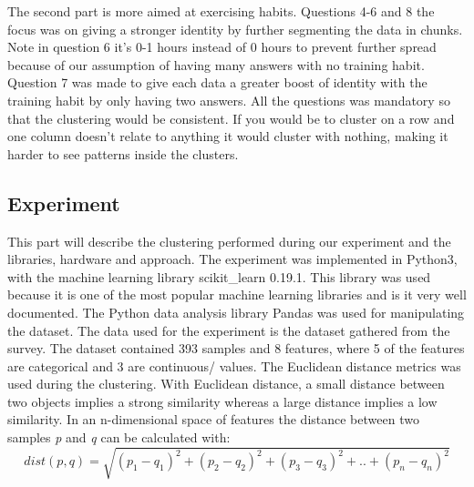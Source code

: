 \documentclass[a4paper]{article}
\begin{document}
The second part is more aimed at exercising habits. Questions 4-6 and 8 the focus was on giving a stronger identity by further segmenting the data in chunks. Note in question 6 it's 0-1 hours instead of 0 hours to prevent further spread because of our assumption of having many answers with no training habit. Question 7 was made to give each data a greater boost of identity with the training habit by only having two answers.
% 
% 
% 
%
All the questions was mandatory so that the clustering would be consistent. If you would be to cluster on a row and one column doesn't relate to anything it would cluster with nothing, making it harder to see patterns inside the clusters.
\newpage
\subsection{Experiment}
This part will describe the clustering performed during our experiment and the libraries, hardware and approach. The experiment was implemented in Python3, with the machine learning library scikit\_learn 0.19.1. This library was used because it is one of the most popular machine learning libraries and is it very well documented. The Python data analysis library Pandas was used for manipulating the dataset.
% 
% 
The data used for the experiment is the dataset gathered from the survey. The dataset contained 393 samples and 8 features, where 5 of the features are categorical and 3 are continuous/ values. The Euclidean distance metrics was used during the clustering. With
Euclidean distance, a small distance between two objects implies a
strong similarity whereas a large distance implies a low similarity. 
In an n-dimensional space of features the distance between two samples \textit{p} and 
\textit{q} can be calculated with:
\[ dist(p, q) = \sqrt{(p_{1} - q_{1})^2 + (p_{2} - q_{2})^2 + (p_{3} - q_{3})^2 + .. + (p_{n} - q_{n})^2} \]
\end{document}
